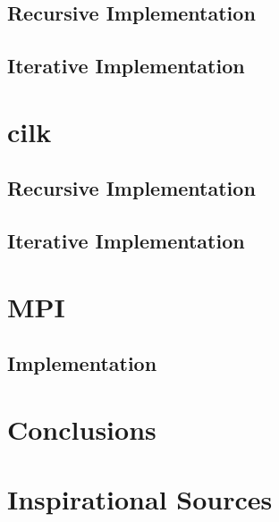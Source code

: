 \documentclass[12pt,a4paper,titlepage,oneside]{scrartcl}
\begin{document}
	\subsection{Recursive Implementation}
	
	\subsection{Iterative Implementation}
	
	
\section{cilk}
	\subsection{Recursive Implementation}
	
	\subsection{Iterative Implementation}
	

\section{MPI}
	\subsection{Implementation}
	
\pagebreak
\section{Conclusions}
	
\section{Inspirational Sources}
	 
%
%
\end{document}
